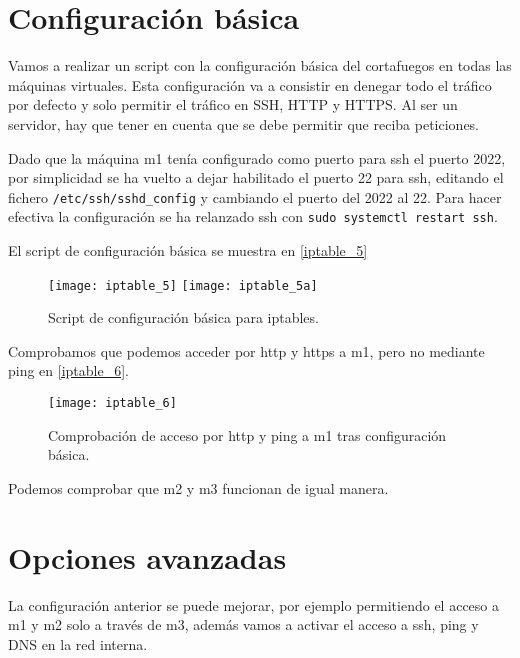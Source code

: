 \section{Configuración básica}

Vamos a realizar un script con la configuración básica del cortafuegos en todas las máquinas virtuales. Esta configuración va a consistir en denegar todo el tráfico por defecto y solo permitir el tráfico en SSH, HTTP y HTTPS. Al ser un servidor, hay que tener en cuenta que se debe permitir que reciba peticiones.

Dado que la máquina m1 tenía configurado como puerto para ssh el puerto 2022, por simplicidad se ha vuelto a dejar habilitado el puerto 22 para ssh, editando el fichero \verb|/etc/ssh/sshd_config| y cambiando el puerto del 2022 al 22. Para hacer efectiva la configuración se ha relanzado ssh con \verb|sudo systemctl restart ssh|.

El script de configuración básica se muestra  en \eqref{iptable_5}

\begin{figure}[h!]
\begin{center}
\caption{Script de configuración básica para iptables.}
\label{iptable_5}
\texttt{[image: iptable\_5]}
\texttt{[image: iptable\_5a]}
\end{center}
\end{figure}

Comprobamos que podemos acceder por http y https a m1, pero no mediante ping en \eqref{iptable_6}.

\begin{figure}[h!]
\begin{center}
\caption{Comprobación de acceso por http y ping a m1 tras configuración básica.}
\label{iptable_6}
\texttt{[image: iptable\_6]}
\end{center}
\end{figure}

Podemos comprobar que m2 y m3 funcionan de igual manera.




\section{Opciones avanzadas}

La configuración anterior se puede mejorar, por ejemplo permitiendo el acceso a m1 y m2 solo a través de m3, además vamos a activar el acceso a ssh, ping y DNS en la red interna.

